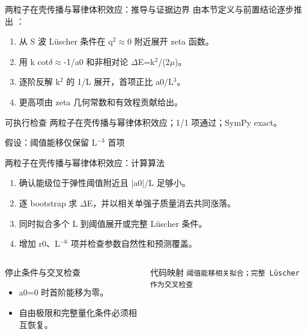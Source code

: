 \begin{frame}[t]{两粒子在壳传播与幂律体积效应：推导与证据边界}
\footnotesize
{}\quad 由本节定义与前置结论逐步推出 ：
\begin{enumerate}
\item 从 S 波 Lüscher 条件在 q\ensuremath{^{2}}\ensuremath{\approx}0 附近展开 zeta 函数。
\item 用 k cot\ensuremath{\delta}\ensuremath{\approx}-1/\allowbreak{}a0 和非相对论 \ensuremath{\Delta}E=k\ensuremath{^{2}}/\allowbreak{}(2\ensuremath{\mu})。
\item 逐阶反解 k\ensuremath{^{2}} 的 1/\allowbreak{}L 展开，首项正比 a0/\allowbreak{}L\ensuremath{^{3}}。
\item 更高项由 zeta 几何常数和有效程贡献给出。
\end{enumerate}\begin{block}{可执行检查}
\quad 两粒子在壳传播与幂律体积效应；1/1 项通过；SymPy exact。
\par\scriptsize 假设：阈值能移仅保留 L\ensuremath{^{-3}} 首项
\end{block}
\end{frame}

\begin{frame}[t]{两粒子在壳传播与幂律体积效应：计算算法}
\footnotesize
{}\begin{enumerate}
\item 确认能级位于弹性阈值附近且 |a0|/\allowbreak{}L 足够小。
\item 逐 bootstrap 求 \ensuremath{\Delta}E，并以相关单强子质量消去共同涨落。
\item 同时拟合多个 L 到阈值展开或完整 Lüscher 条件。
\item 增加 r0、L\ensuremath{^{-6}} 项并检查参数自然性和预测覆盖。
\end{enumerate}\begin{columns}[T,onlytextwidth]
\begin{block}{停止条件与交叉检查}\scriptsize\begin{itemize}
\item[\CheckMark] a0=0 时首阶能移为零。
\item[\CheckMark] 自由极限和完整量化条件必须相互恢复。
\end{itemize}\end{block}
\begin{block}{代码映射}
\scriptsize \texttt{阈值能移相关拟合；完整 Lüscher 作为交叉检查}
\end{block}\end{columns}\end{frame}

